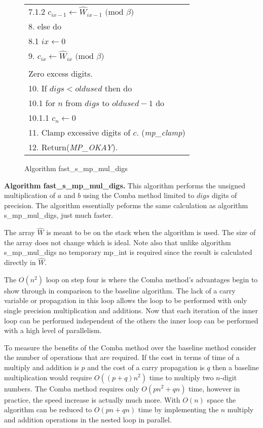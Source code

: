 \documentclass[b5paper]{book}
\begin{document}
\begin{figure}[!here]
\begin{small}
\begin{center}
\begin{tabular}{l}
\hspace{6mm}7.1.2  $c_{ix - 1} \leftarrow \hat W_{ix - 1} \mbox{ (mod }\beta\mbox{)}$ \\
8.  else do \\
\hspace{3mm}8.1  $ix \leftarrow 0$ \\
9.  $c_{ix} \leftarrow \hat W_{ix} \mbox{ (mod }\beta\mbox{)}$ \\
\\
Zero excess digits. \\
10.  If $digs < oldused$ then do \\
\hspace{3mm}10.1  for $n$ from $digs$ to $oldused - 1$ do \\
\hspace{6mm}10.1.1  $c_n \leftarrow 0$ \\
11.  Clamp excessive digits of $c$.  (\textit{mp\_clamp}) \\
12.  Return(\textit{MP\_OKAY}). \\
\hline
\end{tabular}
\end{center}
\end{small}
\caption{Algorithm fast\_s\_mp\_mul\_digs}
\label{fig:COMBAMULT}
\end{figure}

\textbf{Algorithm fast\_s\_mp\_mul\_digs.}
This algorithm performs the unsigned multiplication of $a$ and $b$ using the Comba method limited to $digs$ digits of precision.  The algorithm
essentially peforms the same calculation as algorithm s\_mp\_mul\_digs, just much faster.

The array $\hat W$ is meant to be on the stack when the algorithm is used.  The size of the array does not change which is ideal.  Note also that 
unlike algorithm s\_mp\_mul\_digs no temporary mp\_int is required since the result is calculated directly in $\hat W$.  

The $O(n^2)$ loop on step four is where the Comba method's advantages begin to show through in comparison to the baseline algorithm.  The lack of
a carry variable or propagation in this loop allows the loop to be performed with only single precision multiplication and additions.  Now that each
iteration of the inner loop can be performed independent of the others the inner loop can be performed with a high level of parallelism.

To measure the benefits of the Comba method over the baseline method consider the number of operations that are required.  If the 
cost in terms of time of a multiply and addition is $p$ and the cost of a carry propagation is $q$ then a baseline multiplication would require 
$O \left ((p + q)n^2 \right )$ time to multiply two $n$-digit numbers.  The Comba method requires only $O(pn^2 + qn)$ time, however in practice, 
the speed increase is actually much more.  With $O(n)$ space the algorithm can be reduced to $O(pn + qn)$ time by implementing the $n$ multiply
and addition operations in the nested loop in parallel.  
\end{document}
